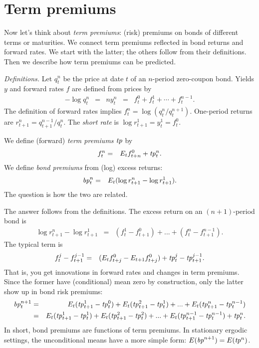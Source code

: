 \documentclass[11pt]{article}
\newcommand{\tp}{\mbox{\it tp\/}}
\newcommand{\bp}{\mbox{\it bp\/}}
\begin{document}
\section{Term premiums}

Now let's think about {\it term premiums\/}:
(risk) premiums on bonds of different terms or maturities.
We connect term premiums
reflected in bond returns and forward rates.
We start with the latter; the others follow from their definitions.
Then we describe how term premiums can be predicted.

{\it Definitions.\/}
Let $q^n_t$ be the price at date $t$ of an $n$-period zero-coupon bond.
Yields $y$ and forward rates $f$ are defined from prices by
\begin{eqnarray*}
    - \log q^n_t  &=&  n y^n_t
            \;\;=\;\;  f^0_t  + f^1_t + \cdots + f^{n-1}_t.
\end{eqnarray*}
The definition of forward rates implies
$ f^n_t = \log (q^n_t/q^{n+1}_t )$.
One-period returns are $  r^n_{t+1} = q^{n-1}_{t+1}/q^n_t $.
The {\it short rate\/} is $\log r^1_{t+1} = y_t^1 = f^0_t $.

We define (forward) {\it term premiums\/} $\tp$ by
\begin{eqnarray}
    f^n_t &=&  E_t f^0_{t+n} + \tp^n_t .
    \label{eq:tp-def}
\end{eqnarray}
We define {\it bond premiums\/} from (log) excess returns:
\begin{eqnarray*}
    \bp^n_t &=& E_t (\log r^n_{t+1}  - \log r^1_{t+1}) .
\end{eqnarray*}
The question is how the two are related.

The answer follows from the definitions.
The excess return on an $(n+1)$-period bond is
\begin{eqnarray*}
   \log r^n_{t+1} - \log r^1_{t+1} &=&
            (f^1_t-f^0_{t+1}) + ... + (f^n_t-f^{n-1}_{t+1}).
\end{eqnarray*}
The typical term is
\begin{eqnarray*}
    f^j_t - f^{j-1}_{t+1} &=&  (E_t f^0_{t+j} - E_{t+1}f^0_{t+j})
        + \tp^j_t - \tp^{j-1}_{t+1} .
\end{eqnarray*}
That is, you get innovations in forward rates and changes in term premiums.  Since the former have (conditional) mean zero by construction, only the latter show up in bond risk premiums:
\begin{eqnarray*}
    \bp^{n+1}_t &=&  E_t (\tp^1_{t+1}-\tp^0_t) + E_t (\tp^2_{t+1}-\tp^1_t)
                    + ... + E_t (\tp^n_{t+1}-\tp^{n-1}_t)       \\
               &=&  E_t (\tp^1_{t+1} - \tp^1_t) + E_t (\tp^2_{t+1}-\tp^2_t)
                  + ... + E_t (\tp^{n-1}_{t+1}-\tp^{n-1}_t) + \tp^n_t .
\end{eqnarray*}
In short, bond premiums are functions of term premiums.
In stationary ergodic settings, the unconditional means have a more simple form: $ E (\bp^{n+1}) = E (\tp^n )$.
\end{document}
